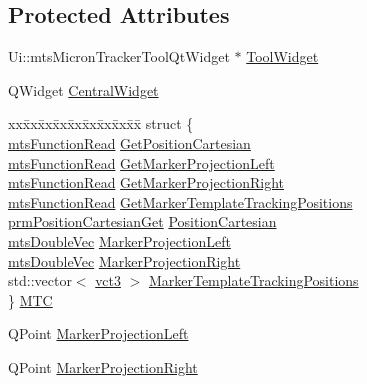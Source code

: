 \subsection*{Protected Attributes}
\begin{DoxyCompactItemize}
\item 
Ui\+::mts\+Micron\+Tracker\+Tool\+Qt\+Widget $\ast$ \hyperlink{classmts_micron_tracker_tool_qt_component_a78d45496b35b856b483e6600599dc4a4}{Tool\+Widget}
\item 
Q\+Widget \hyperlink{classmts_micron_tracker_tool_qt_component_a3337bf48f13cbad9c9101c9aff7a651f}{Central\+Widget}
\item 
\begin{tabbing}
xx\=xx\=xx\=xx\=xx\=xx\=xx\=xx\=xx\=\kill
struct \{\\
\>\hyperlink{classmts_function_read}{mtsFunctionRead} \hyperlink{classmts_micron_tracker_tool_qt_component_accf890d374d0341c43fa64d5f87d170e}{GetPositionCartesian}\\
\>\hyperlink{classmts_function_read}{mtsFunctionRead} \hyperlink{classmts_micron_tracker_tool_qt_component_a2abf35a246c2f4d85351f8d7a08b3e23}{GetMarkerProjectionLeft}\\
\>\hyperlink{classmts_function_read}{mtsFunctionRead} \hyperlink{classmts_micron_tracker_tool_qt_component_aba2e8b10296d4678cfc7000c0e3e0c51}{GetMarkerProjectionRight}\\
\>\hyperlink{classmts_function_read}{mtsFunctionRead} \hyperlink{classmts_micron_tracker_tool_qt_component_a50e15e14b556c72dea6ce2fed154757c}{GetMarkerTemplateTrackingPositions}\\
\>\hyperlink{classprm_position_cartesian_get}{prmPositionCartesianGet} \hyperlink{classmts_micron_tracker_tool_qt_component_a9ce46838a73866850a7a06a339b4d121}{PositionCartesian}\\
\>\hyperlink{mts_vector_8h_af69167a5dc2ad33eb93965b9387d8403}{mtsDoubleVec} \hyperlink{classmts_micron_tracker_tool_qt_component_a1c3d33fbe36a6456bc41353957493b37}{MarkerProjectionLeft}\\
\>\hyperlink{mts_vector_8h_af69167a5dc2ad33eb93965b9387d8403}{mtsDoubleVec} \hyperlink{classmts_micron_tracker_tool_qt_component_ab0ed4ae030ebd937c8719cc8e4457289}{MarkerProjectionRight}\\
\>std::vector$<$ \hyperlink{vct_fixed_size_vector_types_8h_a3af82acdbf4eeb73c551909240b106ea}{vct3} $>$ \hyperlink{classmts_micron_tracker_tool_qt_component_a279cda1e8aff6c12de27f2bbe39bc1d9}{MarkerTemplateTrackingPositions}\\
\} \hyperlink{classmts_micron_tracker_tool_qt_component_a8386ee26f85095141f5ad40fda1e6f50}{MTC}\\

\end{tabbing}\item 
Q\+Point \hyperlink{classmts_micron_tracker_tool_qt_component_a767c7737649f8612dc6df81df6453bd8}{Marker\+Projection\+Left}
\item 
Q\+Point \hyperlink{classmts_micron_tracker_tool_qt_component_a64ed0572f729b8a0505f4b28d7cf20fe}{Marker\+Projection\+Right}
\end{DoxyCompactItemize}
